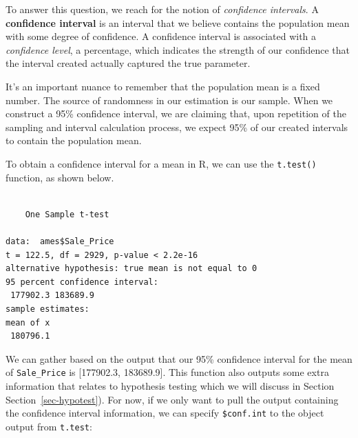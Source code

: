 \documentclass[
  letterpaper,
  DIV=11,
  numbers=noendperiod]{scrreprt}
\newenvironment{Shaded}{\begin{snugshade}}{\end{snugshade}}
\newcommand{\AttributeTok}[1]{\textcolor[rgb]{0.40,0.45,0.13}{#1}}
\newcommand{\FloatTok}[1]{\textcolor[rgb]{0.68,0.00,0.00}{#1}}
\newcommand{\FunctionTok}[1]{\textcolor[rgb]{0.28,0.35,0.67}{#1}}
\newcommand{\NormalTok}[1]{\textcolor[rgb]{0.00,0.23,0.31}{#1}}
\newcommand{\SpecialCharTok}[1]{\textcolor[rgb]{0.37,0.37,0.37}{#1}}
\begin{document}
To answer this question, we reach for the notion of \emph{confidence
intervals}. A \textbf{confidence interval} is an interval that we
believe contains the population mean with some degree of confidence. A
confidence interval is associated with a \emph{confidence level}, a
percentage, which indicates the strength of our confidence that the
interval created actually captured the true parameter.

It's an important nuance to remember that the population mean is a fixed
number. The source of randomness in our estimation is our sample. When
we construct a 95\% confidence interval, we are claiming that, upon
repetition of the sampling and interval calculation process, we expect
95\% of our created intervals to contain the population mean.

To obtain a confidence interval for a mean in R, we can use the
\texttt{t.test()} function, as shown below.

\begin{Shaded}
\end{Shaded}

\begin{verbatim}

    One Sample t-test

data:  ames$Sale_Price
t = 122.5, df = 2929, p-value < 2.2e-16
alternative hypothesis: true mean is not equal to 0
95 percent confidence interval:
 177902.3 183689.9
sample estimates:
mean of x 
 180796.1 
\end{verbatim}

We can gather based on the output that our 95\% confidence interval for
the mean of \texttt{Sale\_Price} is {[}177902.3, 183689.9{]}. This
function also outputs some extra information that relates to hypothesis
testing which we will discuss in Section Section~\ref{sec-hypotest}).
For now, if we only want to pull the output containing the confidence
interval information, we can specify \texttt{\$conf.int} to the object
output from \texttt{t.test}:

\begin{Shaded}
\end{Shaded}
\end{document}
